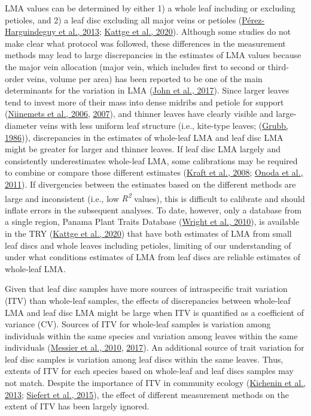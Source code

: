 \documentclass[
  12pt,
  a4paper,
,tablecaptionabove
]{scrartcl}
\begin{document}
LMA values can be determined by either 1) a whole leaf including or
excluding petioles, and 2) a leaf disc excluding all major veins or
petioles
(\protect\hyperlink{ref-Perez-Harguindeguy2013}{Pérez-Harguindeguy et
al., 2013}; \protect\hyperlink{ref-Kattge2020}{Kattge et al., 2020}).
Although some studies do not make clear what protocol was followed,
these differences in the measurement methods may lead to large
discrepancies in the estimates of LMA values because the major vein
allocation (major vein, which includes first to second or third-order
veins, volume per area) has been reported to be one of the main
determinants for the variation in LMA
(\protect\hyperlink{ref-John2017}{John et al., 2017}). Since larger
leaves tend to invest more of their mass into dense midribs and petiole
for support (\protect\hyperlink{ref-Niinemets2006}{Niinemets et al.,
2006}, \protect\hyperlink{ref-Niinemets2007}{2007}), and thinner leaves
have clearly visible and large-diameter veins with less uniform leaf
structure (i.e., kite-type leaves;
(\protect\hyperlink{ref-Grubb1986}{Grubb, 1986})), discrepancies in the
estimates of whole-leaf LMA and leaf disc LMA might be greater for
larger and thinner leaves. If leaf disc LMA largely and consistently
underestimates whole-leaf LMA, some calibrations may be required to
combine or compare those different estimates
(\protect\hyperlink{ref-Kraft2008}{Kraft et al., 2008};
\protect\hyperlink{ref-Onoda2011}{Onoda et al., 2011}). If divergencies
between the estimates based on the different methods are large and
inconsistent (i.e., low \emph{R\textsuperscript{2}} values), this is
difficult to calibrate and should inflate errors in the subsequent
analyses. To date, however, only a database from a single region, Panama
Plant Traits Database (\protect\hyperlink{ref-Wright2010}{Wright et al.,
2010}), is available in the TRY
(\protect\hyperlink{ref-Kattge2020}{Kattge et al., 2020}) that have both
estimates of LMA from small leaf discs and whole leaves including
petioles, limiting of our understanding of under what conditions
estimates of LMA from leaf discs are reliable estimates of whole-leaf
LMA.

Given that leaf disc samples have more sources of intraspecific trait
variation (ITV) than whole-leaf samples, the effects of discrepancies
between whole-leaf LMA and leaf disc LMA might be large when ITV is
quantified as a coefficient of variance (CV). Sources of ITV for
whole-leaf samples is variation among individuals within the same
species and variation among leaves within the same individuals
(\protect\hyperlink{ref-Messier2010}{Messier et al., 2010},
\protect\hyperlink{ref-Messier2017}{2017}). An additional source of
trait variation for leaf disc samples is variation among leaf discs
within the same leaves. Thus, extents of ITV for each species based on
whole-leaf and leaf discs samples may not match. Despite the importance
of ITV in community ecology
(\protect\hyperlink{ref-Kichenin2013}{Kichenin et al., 2013};
\protect\hyperlink{ref-Siefert2015}{Siefert et al., 2015}), the effect
of different measurement methods on the extent of ITV has been largely
ignored.
\end{document}
